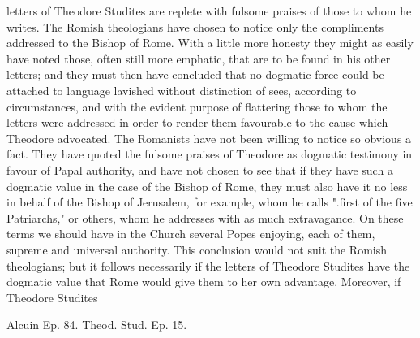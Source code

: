 letters of Theodore Studites are replete with fulsome praises of those to whom he writes. The Romish theologians have chosen to notice only the compliments addressed to the Bishop of Rome. With a little more honesty they might as easily have noted those, often still more emphatic, that are to be found in his other letters; and they must then have concluded that no dogmatic force could be attached to language lavished without distinction of sees, according to circumstances, and with the evident purpose of flattering those to whom the letters were addressed in order to render them favourable to the cause which Theodore advocated. The Romanists have not been willing to notice so obvious a fact. They have quoted the fulsome praises of Theodore as dogmatic testimony in favour of Papal authority, and have not chosen to see that if they have such a dogmatic value in the case of the Bishop of Rome, they must also have it no less in behalf of the Bishop of Jerusalem, for example, whom he calls ".first of the five Patriarchs," or others, whom he addresses with as much extravagance. On these terms we should have in the Church several Popes enjoying, each of them, supreme and universal authority. This conclusion would not suit the Romish theologians; but it follows necessarily if the letters of Theodore Studites have the dogmatic value that Rome would give them to her own advantage. Moreover, if Theodore Studites

Alcuin Ep. 84. Theod. Stud. Ep. 15.

